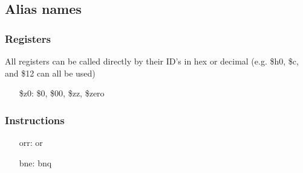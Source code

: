 	\subsection{Alias names}
		\subsubsection{Registers}
			All registers can be called directly by their ID's in hex or decimal (e.g. \$h0, \$c, and \$12 can all be used)
			\begin{itemize}
				\item[\$z0:] \$0, \$00, \$zz, \$zero
			\end{itemize}
		\subsubsection{Instructions}
			\begin{itemize}
				\item[orr:] or
				\item[bne:] bnq
			\end{itemize}
